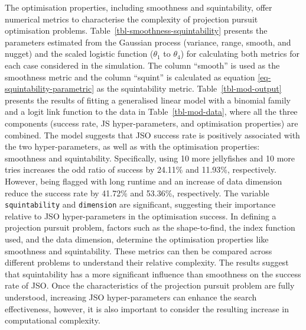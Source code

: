 \documentclass[
  number,
  preprint,
  3p]{elsarticle}
\begin{document}
The optimisation properties, including smoothness and squintability,
offer numerical metrics to characterise the complexity of projection
pursuit optimisation problems. Table~\ref{tbl-smoothness-squintability}
presents the parameters estimated from the Gaussian process (variance,
range, smooth, and nugget) and the scaled logistic function
(\(\theta_1\) to \(\theta_4\)) for calculating both metrics for each
case considered in the simulation. The column ``smooth'' is used as the
smoothness metric and the column ``squint'' is calculated as equation
\ref{eq-squintability-parametric} as the squintability metric.
Table~\ref{tbl-mod-output} presents the results of fitting a generalised
linear model with a binomial family and a logit link function to the
data in Table~\ref{tbl-mod-data}, where all the three components
(success rate, JS hyper-parameters, and optimisation properties) are
combined. The model suggests that JSO success rate is positively
associated with the two hyper-parameters, as well as with the
optimisation properties: smoothness and squintability. Specifically,
using 10 more jellyfishes and 10 more tries increases the odd ratio of
success by 24.11\% and 11.93\%, respectively. However, being flagged
with long runtime and an increase of data dimension reduce the success
rate by 41.72\% and 53.36\%, respectively. The variable
\texttt{squintability} and \texttt{dimension} are significant,
suggesting their importance relative to JSO hyper-parameters in the
optimisation success. In defining a projection pursuit problem, factors
such as the shape-to-find, the index function used, and the data
dimension, determine the optimisation properties like smoothness and
squintability. These metrics can then be compared across different
problems to understand their relative complexity. The results suggest
that squintability has a more significant influence than smoothness on
the success rate of JSO. Once the characteristics of the projection
pursuit problem are fully understood, increasing JSO hyper-parameters
can enhance the search effectiveness, however, it is also important to
consider the resulting increase in computational complexity.
\end{document}
